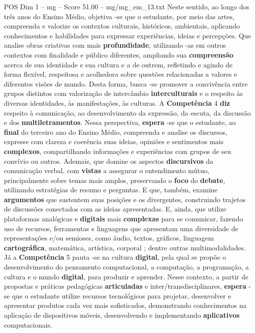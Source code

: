 \begin{textsample}{POS Dim 1 – mg – Score 51.00 – mg/mg\_em\_13.txt}
Neste sentido, ao longo dos três anos do Ensino Médio, objetiva -se que o estudante, por meio das artes, compreenda e valorize os contextos culturais, históricos, ambientais, aplicando conhecimentos e habilidades para expressar experiências, ideias e percepções.
Que analise obras criativas com mais \textbf{profundidade}, utilizando -as em outros contextos com finalidade e público diferentes, ampliando sua \textbf{compreensão} acerca de sua identidade e sua cultura e a de outrem, refletindo e agindo de forma flexível, respeitosa e acolhedora sobre questões relacionadas a valores e diferentes visões de mundo.
Desta forma, busca -se promover a convivência entre grupos distintos com valorização de intercâmbio \textbf{interculturais} e o respeito às diversas identidades, às manifestações, às culturas.
A \textbf{Competência} 4 \textbf{diz} respeito à comunicação, ao desenvolvimento da expressão, da escuta, da discussão e dos \textbf{multiletramentos}.
Nessa perspectiva, \textbf{espera} -se que o estudante, ao \textbf{final} do terceiro ano do Ensino Médio, compreenda e analise os discursos, expresse com clareza e coerência suas ideias, opiniões e sentimentos mais \textbf{complexos}, compartilhando informações e experiências com grupos de seu convívio ou outros.
Ademais, que domine os aspectos \textbf{discursivos} da comunicação verbal, com \textbf{vistas} a assegurar o entendimento mútuo, principalmente sobre temas mais amplos, preservando o \textbf{foco} do \textbf{debate}, utilizando estratégias de resumo e perguntas.
E que, também, examine \textbf{argumentos} que sustentem suas posições e os divergentes, construindo trajetos de discussões conectados com as ideias apresentadas.
E, ainda, que utilize plataformas analógicas e \textbf{digitais} mais \textbf{complexas} para se comunicar, fazendo uso de recursos, ferramentas e linguagens que apresentam uma diversidade de representações e/ou semioses, como áudio, textos, gráficos, linguagem \textbf{cartográfica}, matemática, artística, corporal ; dentre outras multimodalidades.
Já a \textbf{Competência} 5 pauta -se na cultura \textbf{digital}, pela qual se propõe o desenvolvimento do pensamento computacional, a computação, a programação, a cultura e o mundo \textbf{digital}, para produzir e aprender.
Nesse contexto, a partir de propostas e práticas pedagógicas \textbf{articuladas} e inter/transdisciplinares, \textbf{espera} -se que o estudante utilize recursos tecnológicos para projetar, desenvolver e apresentar produtos cada vez mais sofisticados, demonstrando conhecimentos na aplicação de dispositivos móveis, desenvolvendo e implementando \textbf{aplicativos} computacionais.

\end{textsample}
